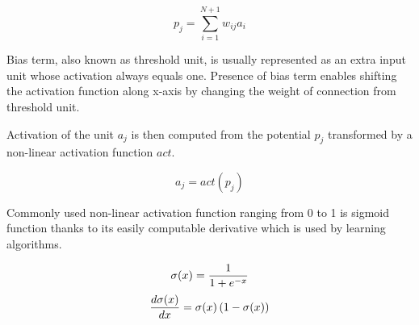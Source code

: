 \documentclass[12pt,oneside]{fithesis2}
\begin{document}
$$p_{j} = \sum\limits_{i = 1}^{N+1} w_{ij} a_{i}$$

Bias term, also known as threshold unit, is usually represented as an extra input unit whose activation always equals one. Presence of bias term enables shifting the activation function along x-axis by changing the weight of connection from threshold unit.

Activation of the unit $a_j$ is then computed from the potential $p_j$ transformed by a non-linear activation function $act$.

$$a_{j} = act\left(p_j\right)$$
\par
Commonly used non-linear activation function ranging from 0 to 1 is sigmoid function thanks to its easily computable derivative which is used by learning algorithms.

$$\sigma(x) = {1 \over {1 + e^{-x}}}$$
$${{d\sigma(x)} \over dx} = \sigma(x)  \left(1 - \sigma(x)\right)$$
\end{document}
